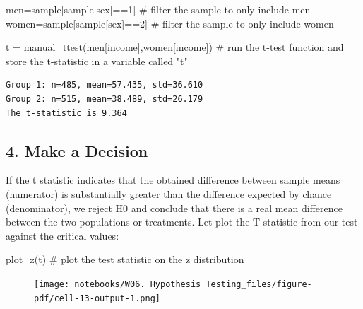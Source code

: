 \documentclass[
  letterpaper,
  DIV=11,
  numbers=noendperiod]{scrreprt}
\newenvironment{Shaded}{\begin{snugshade}}{\end{snugshade}}
\newcommand{\CommentTok}[1]{\textcolor[rgb]{0.37,0.37,0.37}{#1}}
\newcommand{\DecValTok}[1]{\textcolor[rgb]{0.68,0.00,0.00}{#1}}
\newcommand{\NormalTok}[1]{\textcolor[rgb]{0.00,0.23,0.31}{#1}}
\newcommand{\OperatorTok}[1]{\textcolor[rgb]{0.37,0.37,0.37}{#1}}
\newcommand{\StringTok}[1]{\textcolor[rgb]{0.13,0.47,0.30}{#1}}
\begin{document}
\begin{Shaded}
\begin{Highlighting}[]
\NormalTok{men}\OperatorTok{=}\NormalTok{sample[sample[}\StringTok{\textquotesingle{}sex\textquotesingle{}}\NormalTok{]}\OperatorTok{==}\DecValTok{1}\NormalTok{] }\CommentTok{\# filter the sample to only include men}
\NormalTok{women}\OperatorTok{=}\NormalTok{sample[sample[}\StringTok{\textquotesingle{}sex\textquotesingle{}}\NormalTok{]}\OperatorTok{==}\DecValTok{2}\NormalTok{] }\CommentTok{\# filter the sample to only include women}

\NormalTok{t }\OperatorTok{=}\NormalTok{ manual\_ttest(men[}\StringTok{\textquotesingle{}income\textquotesingle{}}\NormalTok{],women[}\StringTok{\textquotesingle{}income\textquotesingle{}}\NormalTok{]) }\CommentTok{\# run the t{-}test function and store the t{-}statistic in a variable called "t"}
\end{Highlighting}
\end{Shaded}

\begin{verbatim}
Group 1: n=485, mean=57.435, std=36.610
Group 2: n=515, mean=38.489, std=26.179
The t-statistic is 9.364
\end{verbatim}

\hypertarget{make-a-decision}{%
\subsection{4. Make a Decision}\label{make-a-decision}}

If the t statistic indicates that the obtained difference between sample
means (numerator) is substantially greater than the difference expected
by chance (denominator), we reject H0 and conclude that there is a real
mean difference between the two populations or treatments. Let plot the
T-statistic from our test against the critical values:

\begin{Shaded}
\begin{Highlighting}[]
\NormalTok{plot\_z(t) }\CommentTok{\# plot the test statistic on the z distribution}
\end{Highlighting}
\end{Shaded}

\begin{figure}[H]

{\centering \texttt{[image: notebooks/W06. Hypothesis Testing\_files/figure-pdf/cell-13-output-1.png]}

}

\end{figure}
\end{document}
